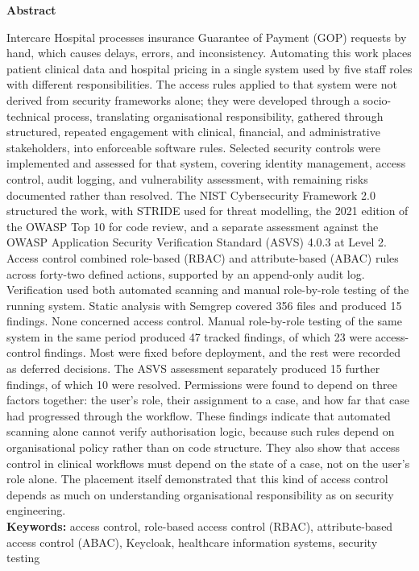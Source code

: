 
\newpage
\thispagestyle{empty}

 \begin{center}
     {\huge \textbf{Abstract}} \\[1.5cm]
 \end{center}

Intercare Hospital processes insurance Guarantee of Payment (GOP) requests by hand, which causes delays, errors, and inconsistency. Automating this work places patient clinical data and hospital pricing in a single system used by five staff roles with different responsibilities. The access rules applied to that system were not derived from security frameworks alone; they were developed through a socio-technical process, translating organisational responsibility, gathered through structured, repeated engagement with clinical, financial, and administrative stakeholders, into enforceable software rules. Selected security controls were implemented and assessed for that system, covering identity management, access control, audit logging, and vulnerability assessment, with remaining risks documented rather than resolved. The NIST Cybersecurity Framework 2.0 structured the work, with STRIDE used for threat modelling, the 2021 edition of the OWASP Top 10 for code review, and a separate assessment against the OWASP Application Security Verification Standard (ASVS) 4.0.3 at Level 2. Access control combined role-based (RBAC) and attribute-based (ABAC) rules across forty-two defined actions, supported by an append-only audit log. Verification used both automated scanning and manual role-by-role testing of the running system. Static analysis with Semgrep covered 356 files and produced 15 findings. None concerned access control. Manual role-by-role testing of the same system in the same period produced 47 tracked findings, of which 23 were access-control findings. Most were fixed before deployment, and the rest were recorded as deferred decisions. The ASVS assessment separately produced 15 further findings, of which 10 were resolved. Permissions were found to depend on three factors together: the user's role, their assignment to a case, and how far that case had progressed through the workflow. These findings indicate that automated scanning alone cannot verify authorisation logic, because such rules depend on organisational policy rather than on code structure. They also show that access control in clinical workflows must depend on the state of a case, not on the user's role alone. The placement itself demonstrated that this kind of access control depends as much on understanding organisational responsibility as on security engineering.
\\
\textbf{Keywords:} access control, role-based access control (RBAC), attribute-based access control (ABAC), Keycloak, healthcare information systems, security testing
